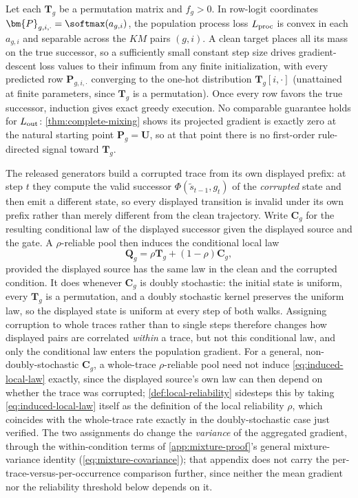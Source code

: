 \begin{remark}[Clean convergence, the $\rho=1$ case]
\label{cor:clean-convergence}
Let each $\bm{T}_g$ be a permutation matrix and $f_g>0$. In row-logit coordinates
$\bm{P}_{g,i,\cdot}=\softmax(a_{g,i})$, the population process loss $L_{\rm proc}$
is convex in each $a_{g,i}$ and separable across the $KM$ pairs $(g,i)$. A
clean target places all its mass on the true successor, so a sufficiently
small constant step size drives gradient-descent loss values to their
infimum from any finite initialization, with every predicted row
$\bm{P}_{g,i,\cdot}$ converging to the one-hot distribution $\bm{T}_g[i,\cdot]$
(unattained at finite parameters, since $\bm{T}_g$ is a permutation). Once
every row favors the true successor, induction gives exact greedy
execution. No comparable guarantee holds for $L_{\rm out}$:
\cref{thm:complete-mixing} shows its projected gradient is exactly zero at
the natural starting point $\bm{P}_g=\bm{U}$, so at that point there is no
first-order rule-directed signal toward $\bm{T}_g$.
\end{remark}

The released generators build a corrupted trace from its own displayed prefix:
at step $t$ they compute the valid successor $\Phi(\widetilde s_{t-1},g_t)$ of
the \emph{corrupted} state and then emit a different state, so every displayed
transition is invalid under its own prefix rather than merely different from the
clean trajectory.  Write $\bm{C}_g$ for the resulting conditional law of the
displayed successor given the displayed source and the gate.  A
$\rho$-reliable pool then induces the conditional local law
\begin{equation}
 \bm{Q}_g=\rho \bm{T}_g+(1-\rho)\bm{C}_g ,
 \label{eq:induced-local-law}
\end{equation}
provided the displayed source has the same law in the clean and the corrupted
condition.  It does whenever $\bm{C}_g$ is doubly stochastic: the initial state is
uniform, every $\bm{T}_g$ is a permutation, and a doubly stochastic kernel preserves
the uniform law, so the displayed state is uniform at every step of both walks.
Assigning corruption to whole traces rather than to single steps therefore
changes how displayed pairs are correlated \emph{within} a trace, but not this
conditional law, and only the conditional law enters the population gradient.
For a general, non-doubly-stochastic $\bm{C}_g$, a whole-trace $\rho$-reliable
pool need not induce \cref{eq:induced-local-law} exactly, since the
displayed source's own law can then depend on whether the trace was
corrupted; \cref{def:local-reliability} sidesteps this by taking
\cref{eq:induced-local-law} itself as the definition of the local
reliability $\rho$, which coincides with the whole-trace rate exactly in
the doubly-stochastic case just verified.
The two assignments do change the \emph{variance} of the aggregated gradient,
through the within-condition terms of \cref{app:mixture-proof}'s general
mixture-variance identity (\cref{eq:mixture-covariance}); that appendix does
not carry the per-trace-versus-per-occurrence comparison further, since
neither the mean gradient nor the reliability threshold below depends on it.

